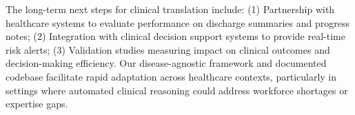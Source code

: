 The long-term next steps for clinical translation include: 
(1) Partnership with healthcare systems to evaluate performance on discharge summaries and progress notes; 
(2) Integration with clinical decision support systems to provide real-time risk alerts; 
(3) Validation studies measuring impact on clinical outcomes and decision-making efficiency. 
Our disease-agnostic framework and documented codebase facilitate rapid adaptation across healthcare contexts, particularly in settings where automated clinical reasoning could address workforce shortages or expertise gaps.


